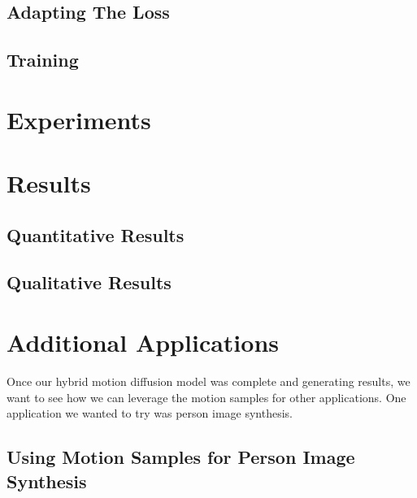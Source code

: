 \documentclass[10pt,twocolumn,letterpaper]{article}
\begin{document}
\subsection{Adapting The Loss}

\subsection{Training}

\section{Experiments}
\label{sec:experiments}

\section{Results}
\label{sec:results}

\subsection{Quantitative Results}

\subsection{Qualitative Results}

\section{Additional Applications}
\label{sec:additional-applications}

Once our hybrid motion diffusion model was complete and generating results, we want to see how we can
leverage the motion samples for other applications. One application we wanted to try was person image 
synthesis.

\subsection{Using Motion Samples for Person Image Synthesis}
\end{document}
